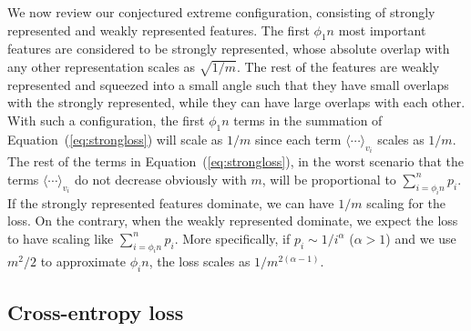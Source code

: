 \documentclass{article}
\begin{document}
We now review our conjectured extreme configuration, consisting of strongly represented and weakly represented features. The first $\phi_1 n$ most important features are considered to be strongly represented, whose absolute overlap with any other representation scales as $\sqrt{1/m}$. The rest of the features are weakly represented and squeezed into a small angle such that they have small overlaps with the strongly represented, while they can have large overlaps with each other. With such a configuration, the first $\phi_1 n$ terms in the summation of Equation~(\ref{eq:strongloss}) will scale as $1/m$ since each term $\langle \cdots \rangle_{v_i}$ scales as $1/m$. The rest of the terms in Equation~(\ref{eq:strongloss}), in the worst scenario that the terms $\langle \cdots \rangle_{v_i}$ do not decrease obviously with $m$, will be proportional to $\sum_{i=\phi_i n}^n p_i$. If the strongly represented features dominate, we can have $1/m$ scaling for the loss. On the contrary, when the weakly represented dominate, we expect the loss to have scaling like $\sum_{i=\phi_i n}^n p_i$. More specifically, if $p_i \sim 1 / i^\alpha$ ($\alpha >1$) and we use $m^2/2$ to approximate $\phi_i n$, the loss scales as $1 / m^{2(\alpha -1)}$.

\subsection{Cross-entropy loss}\label{app:crossentropy}
\end{document}
